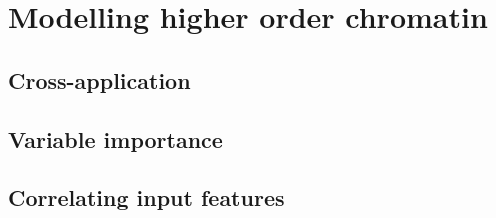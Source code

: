 \documentclass[a4paper,11pt,oneside]{book}
\begin{document}
\section{Modelling higher order chromatin}

\subsection{Cross-application}

\subsection{Variable importance}



\subsection{Correlating input features}

\ifstandalone
\begin{small}

\end{small}
\fi
\end{document}
